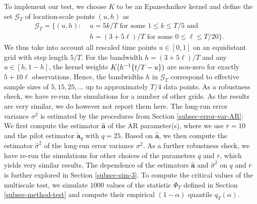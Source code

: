 To implement our test, we choose $K$ to be an Epanechnikov kernel and define the set $\mathcal{G}_T$ of location-scale points $(u,h)$ as
\begin{align}
\mathcal{G}_T = \big\{ (u, h): & \, \, u = 5k/T \text{ for some } 1 \le k \le T/5 \text{ and } \nonumber \\ & \, \, h = (3+5\ell)/T \text{ for some } 0 \le \ell \le T/20 \big\}. \label{grid-sim-app}
\end{align}
We thus take into account all rescaled time points $u \in [0,1]$ on an equidistant grid with step length $5/T$. For the bandwidth $h = (3 + 5\ell)/T$ and any $u \in [h,1-h]$, the kernel weights $K(h^{-1} \{t/T-u\})$ are non-zero for exactly $5 + 10 \ell$ observations. Hence, the bandwidths $h$ in $\mathcal{G}_T$ correspond to effective sample sizes of $5, 15, 25, \ldots$ up to approximately $T/4$ data points. As a robustness check, we have re-run the simulations for a number of other grids. As the results are very similar, we do however not report them here. The long-run error variance $\sigma^2$ is estimated by the procedures from Section \ref{subsec-error-var-AR}: We first compute the estimator $\widehat{\boldsymbol{a}}$ of the AR parameter(s), where we use $\overline{r} = 10$ and the pilot estimator $\widetilde{\boldsymbol{a}}_q$ with $q = 25$. Based on $\widehat{\boldsymbol{a}}$, we then compute the estimator $\widehat{\sigma}^2$ of the long-run error variance $\sigma^2$. As a further robustness check, we have re-run the simulations for other choices of the parameters $q$ and $\overline{r}$, which yields very similar results. The dependence of the estimators $\widehat{\boldsymbol{a}}$ and $\widehat{\sigma}^2$ on $q$ and $\overline{r}$ is further explored in Section \ref{subsec-sim-3}. To compute the critical values of the multiscale test, we simulate $1000$ values of the statistic $\Phi_T$ defined in Section \ref{subsec-method-test} and compute their empirical $(1-\alpha)$ quantile $q_T(\alpha)$. 


